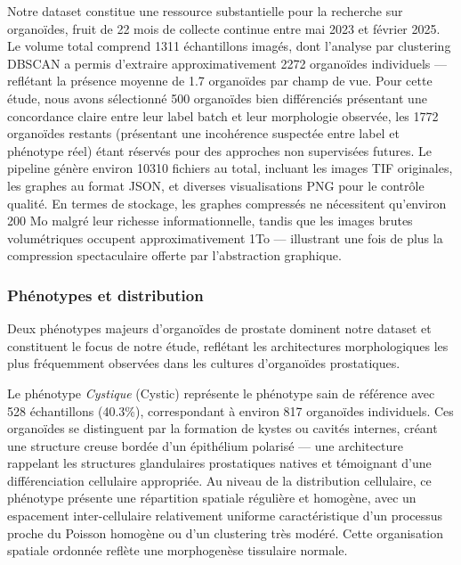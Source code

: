 Notre dataset constitue une ressource substantielle pour la recherche sur organoïdes, fruit de 22 mois de collecte continue entre mai 2023 et février 2025. Le volume total comprend 1311 échantillons imagés, dont l'analyse par clustering DBSCAN a permis d'extraire approximativement 2272 organoïdes individuels — reflétant la présence moyenne de 1.7 organoïdes par champ de vue. Pour cette étude, nous avons sélectionné 500 organoïdes bien différenciés présentant une concordance claire entre leur label batch et leur morphologie observée, les 1772 organoïdes restants (présentant une incohérence suspectée entre label et phénotype réel) étant réservés pour des approches non supervisées futures. Le pipeline génère environ 10310 fichiers au total, incluant les images TIF originales, les graphes au format JSON, et diverses visualisations PNG pour le contrôle qualité. En termes de stockage, les graphes compressés ne nécessitent qu'environ 200 Mo malgré leur richesse informationnelle, tandis que les images brutes volumétriques occupent approximativement 1To — illustrant une fois de plus la compression spectaculaire offerte par l'abstraction graphique.

\subsubsection{Phénotypes et distribution}

Deux phénotypes majeurs d'organoïdes de prostate dominent notre dataset et constituent le focus de notre étude, reflétant les architectures morphologiques les plus fréquemment observées dans les cultures d'organoïdes prostatiques.

Le phénotype \textit{Cystique} (Cystic) représente le phénotype sain de référence avec 528 échantillons (40.3\%), correspondant à environ 817 organoïdes individuels. Ces organoïdes se distinguent par la formation de kystes ou cavités internes, créant une structure creuse bordée d'un épithélium polarisé — une architecture rappelant les structures glandulaires prostatiques natives et témoignant d'une différenciation cellulaire appropriée. Au niveau de la distribution cellulaire, ce phénotype présente une répartition spatiale régulière et homogène, avec un espacement inter-cellulaire relativement uniforme caractéristique d'un processus proche du Poisson homogène ou d'un clustering très modéré. Cette organisation spatiale ordonnée reflète une morphogenèse tissulaire normale.

